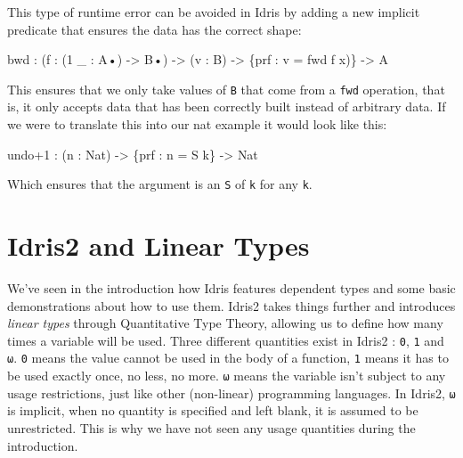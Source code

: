 \documentclass[
]{article}
\newenvironment{Shaded}{}{}
\newcommand{\DataTypeTok}[1]{\textcolor[rgb]{0.56,0.13,0.00}{#1}}
\newcommand{\DecValTok}[1]{\textcolor[rgb]{0.25,0.63,0.44}{#1}}
\newcommand{\NormalTok}[1]{#1}
\newcommand{\OperatorTok}[1]{\textcolor[rgb]{0.40,0.40,0.40}{#1}}
\newcommand{\OtherTok}[1]{\textcolor[rgb]{0.00,0.44,0.13}{#1}}
\begin{document}
This type of runtime error can be avoided in Idris by adding a new
implicit predicate that ensures the data has the correct shape:

\begin{Shaded}
\begin{Highlighting}[]
\NormalTok{bwd }\OperatorTok{:}\NormalTok{ (f }\OperatorTok{:}\NormalTok{ (}\DecValTok{1}\NormalTok{ \_ }\OperatorTok{:} \DataTypeTok{A}\NormalTok{•) }\OtherTok{{-}\textgreater{}} \DataTypeTok{B}\NormalTok{•) }\OtherTok{{-}\textgreater{}}\NormalTok{ (v }\OperatorTok{:} \DataTypeTok{B}\NormalTok{) }\OtherTok{{-}\textgreater{}}\NormalTok{ \{prf }\OperatorTok{:}\NormalTok{ v }\OtherTok{=}\NormalTok{ fwd f x)\} }\OtherTok{{-}\textgreater{}} \DataTypeTok{A}
\end{Highlighting}
\end{Shaded}

This ensures that we only take values of \texttt{B} that come from a
\texttt{fwd} operation, that is, it only accepts data that has been
correctly built instead of arbitrary data. If we were to translate this
into our nat example it would look like this:

\begin{Shaded}
\begin{Highlighting}[]
\NormalTok{undo}\OperatorTok{+}\DecValTok{1} \OperatorTok{:}\NormalTok{ (n }\OperatorTok{:} \DataTypeTok{Nat}\NormalTok{) }\OtherTok{{-}\textgreater{}}\NormalTok{ \{prf }\OperatorTok{:}\NormalTok{ n }\OtherTok{=} \DataTypeTok{S}\NormalTok{ k\} }\OtherTok{{-}\textgreater{}} \DataTypeTok{Nat}
\end{Highlighting}
\end{Shaded}

Which ensures that the argument is an \texttt{S} of \texttt{k} for any
\texttt{k}.

\newpage

\hypertarget{idris2-and-linear-types}{%
\section{Idris2 and Linear Types}\label{idris2-and-linear-types}}

We've seen in the introduction how Idris features dependent types and
some basic demonstrations about how to use them. Idris2 takes things
further and introduces \emph{linear types} through Quantitative Type
Theory, allowing us to define how many times a variable will be used.
Three different quantities exist in Idris2 : \texttt{0}, \texttt{1} and
\texttt{ω}. \texttt{0} means the value cannot be used in the body of a
function, \texttt{1} means it has to be used exactly once, no less, no
more. \texttt{ω} means the variable isn't subject to any usage
restrictions, just like other (non-linear) programming languages. In
Idris2, \texttt{ω} is implicit, when no quantity is specified and left
blank, it is assumed to be unrestricted. This is why we have not seen
any usage quantities during the introduction.
\end{document}
